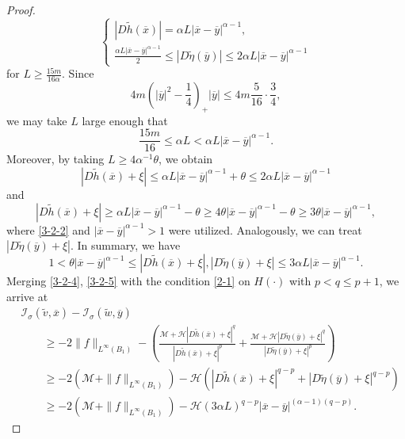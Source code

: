\documentclass[10pt,a4paper]{amsart}
\begin{document}
\begin{proof}
\begin{equation*}
\begin{cases}
|D\widetilde{h}(\overline{x})|=\alpha L|\overline{x}-\overline{y}|^{\alpha-1}, \\
\frac{\alpha L|\overline{x}-\overline{y}|^{\alpha-1}}{2}\le|D\widetilde{\eta}(\overline{y})|\le2\alpha L|\overline{x}-\overline{y}|^{\alpha-1}
\end{cases}
\end{equation*}
for $L\ge\frac{15m}{16\alpha}$. Since
$$
4m\left(|\overline{y}|^2-\frac{1}{4}\right)_+|\overline{y}|\le 4m\frac{5}{16}\cdot\frac{3}{4},$$
we may take $L$ large enough that
$$
\frac{15m}{16}\le\alpha L<\alpha L|\overline{x}-\overline{y}|^{\alpha-1}.
$$
Moreover, by taking $L\ge4\alpha^{-1}\theta$, we obtain
$$
|D\widetilde{h}(\overline{x})+\xi|\le\alpha L|\overline{x}-\overline{y}|^{\alpha-1}+\theta\le 2\alpha L|\overline{x}-\overline{y}|^{\alpha-1}
$$
and
$$
|D\widetilde{h}(\overline{x})+\xi|\ge\alpha L|\overline{x}-\overline{y}|^{\alpha-1}-\theta\ge4\theta|\overline{x}-\overline{y}|^{\alpha-1}-\theta\ge3\theta|\overline{x}-\overline{y}|^{\alpha-1},
$$
where \eqref{3-2-2} and $|\overline{x}-\overline{y}|^{\alpha-1}>1$ were utilized. Analogously, we can treat $|D\widetilde{\eta}(\overline{y})+\xi|$. In summary, we have
\begin{equation}
\label{3-2-5}
1<\theta|\overline{x}-\overline{y}|^{\alpha-1}\le|D\widetilde{h}(\overline{x})+\xi|,|D\widetilde{\eta}(\overline{y})+\xi|\le3\alpha L|\overline{x}-\overline{y}|^{\alpha-1}.
\end{equation}
Merging \eqref{3-2-4}, \eqref{3-2-5} with the condition \eqref{2-1} on $H(\cdot)$ with $p<q\le p+1$, we arrive at
\begin{equation}
\label{3-2-6}
\begin{split}
&\mathcal{I}_\sigma(\widetilde{v},\overline{x})-\mathcal{I}_\sigma(\widetilde{w},\overline{y}) \\
&\qquad\ge-2\|f\|_{L^\infty(B_1)}-\left(\frac{\mathcal{M}+\mathcal{H}|D\widetilde{h}(\overline{x})+\xi|^q}{|D\widetilde{h}(\overline{x})+\xi|^p}+
\frac{\mathcal{M}+\mathcal{H}|D\widetilde{\eta}(\overline{y})+\xi|^q}{|D\widetilde{\eta}(\overline{y})+\xi|^p}\right) \\
&\qquad\ge-2(\mathcal{M}+\|f\|_{L^\infty(B_1)})-\mathcal{H}\left(|D\widetilde{h}(\overline{x})+\xi|^{q-p}+|D\widetilde{\eta}(\overline{y})+\xi|^{q-p}\right) \\
&\qquad\ge-2(\mathcal{M}+\|f\|_{L^\infty(B_1)})-\mathcal{H}(3\alpha L)^{q-p}|\overline{x}-\overline{y}|^{(\alpha-1)(q-p)}.
\end{split}
\end{equation}


\end{proof}
\end{document}
